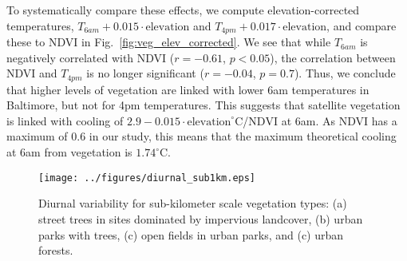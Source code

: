 \documentclass[draft,linenumbers]{agujournal}
\begin{document}
To systematically compare these effects, 
we compute elevation-corrected temperatures, $T_{6am} + 0.015\cdot \text{elevation}$ and $T_{4pm} + 0.017\cdot \text{elevation}$, and compare these to NDVI in Fig.~\ref{fig:veg_elev_corrected}. We see that while $T_{6am}$ is negatively correlated with NDVI ($r=-0.61$, $p<0.05$), the correlation between NDVI and $T_{4pm}$ is no longer significant ($r=-0.04$, $p=0.7$). 
Thus, we conclude that higher levels of vegetation are linked with lower 6am temperatures in Baltimore, but not for 4pm temperatures. This suggests that satellite vegetation is linked with cooling of $2.9 - 0.015\cdot \text{elevation} ^\circ$C/$\text{NDVI}$ at 6am. As NDVI has a maximum of $0.6$ in our study, this means that the maximum theoretical cooling at 6am from vegetation is $1.74^\circ$C. 

\begin{figure}
\centering
\texttt{[image: ../figures/diurnal\_sub1km.eps]}
\caption{Diurnal variability for sub-kilometer scale vegetation types: (a) street trees in sites dominated by impervious landcover, (b) urban parks with trees, (c) open fields in urban parks, and (c) urban forests. }
\label{fig:diurnal_urbanforests_etc}
\end{figure}
\end{document}
